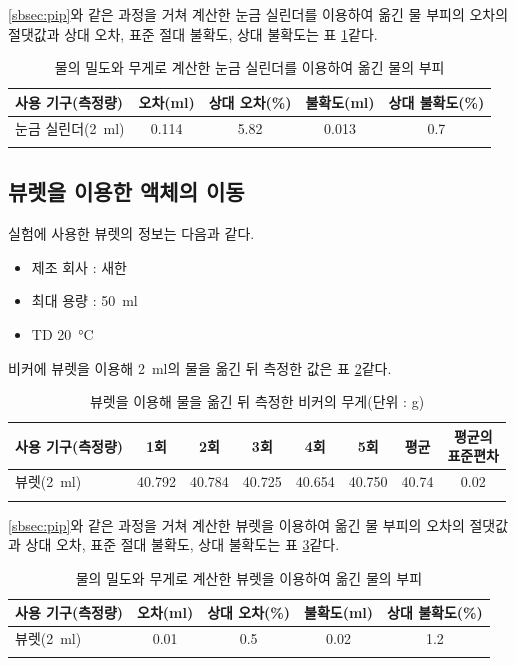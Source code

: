 \documentclass{GSHS-chemexp}
\begin{document}
	\ref{sbsec:pip}와 같은 과정을 거쳐 계산한 눈금 실린더를 이용하여 옮긴
	물 부피의 오차의 절댓값과 상대 오차, 표준 절대 불확도, 상대 불확도는
	표 \ref{tab:calc2}\과 같다.
	
	\begin{table}[H]
		\centering
		\begin{tabular}{l c c c c}
			\thickhline
			사용 기구(측정량) &
			오차(\si{\milli\litre}) &
			상대 오차(\%) &
			불확도(\si{\milli\litre}) &
			상대 불확도(\%) \\
			\hline
			눈금 실린더(\SI{2}{\milli\litre}) &
			0.114 & 5.82 & 0.013 & 0.7 \\
			\thickhline
		\end{tabular}
		\caption{물의 밀도와 무게로 계산한
			눈금 실린더를 이용하여 옮긴 물의 부피}
		\label{tab:calc2}
	\end{table}
	
	\subsection{뷰렛을 이용한 액체의 이동}
	실험에 사용한 뷰렛의 정보는 다음과 같다.
	\begin{itemize}
		\item 제조 회사 : 새한
		\item 최대 용량 : \SI{50}{\milli\litre}
		\item TD \SI{20}{\degreeCelsius}
	\end{itemize}
	
	비커에 뷰렛을 이용해 \SI{2}{\milli\litre}의 물을 옮긴 뒤 측정한 값은
	표 \ref{tab:data3}\과 같다.
	\begin{table}[H]
		\centering
		\begin{tabular}{l c c c c c c c}
			\thickhline
			사용 기구(측정량) & 1회 & 2회 & 3회 & 4회 & 5회 &
			평균 & \makecell{평균의\\표준편차} \\
			\hline
			뷰렛(\SI{2}{\milli\litre}) &
			40.792 & 40.784 & 40.725 & 40.654 &
			40.750 & 40.74 & 0.02 \\
			\thickhline
		\end{tabular}
		\caption{뷰렛을 이용해 물을 옮긴 뒤 측정한
			비커의 무게(단위 : \si{\gram})}
		\label{tab:data3}
	\end{table}
	
	\ref{sbsec:pip}와 같은 과정을 거쳐 계산한 뷰렛을 이용하여 옮긴
	물 부피의 오차의 절댓값과 상대 오차, 표준 절대 불확도, 상대 불확도는
	표 \ref{tab:calc3}\과 같다.
	
	\begin{table}[H]
		\centering
		\begin{tabular}{l c c c c}
			\thickhline
			사용 기구(측정량) &
			오차(\si{\milli\litre}) &
			상대 오차(\%) &
			불확도(\si{\milli\litre}) &
			상대 불확도(\%) \\
			\hline
			뷰렛(\SI{2}{\milli\litre}) &
			0.01 & 0.5 & 0.02 & 1.2 \\
			\thickhline
		\end{tabular}
		\caption{물의 밀도와 무게로 계산한 뷰렛을 이용하여 옮긴 물의 부피}
		\label{tab:calc3}
	\end{table}
	
\end{document}
